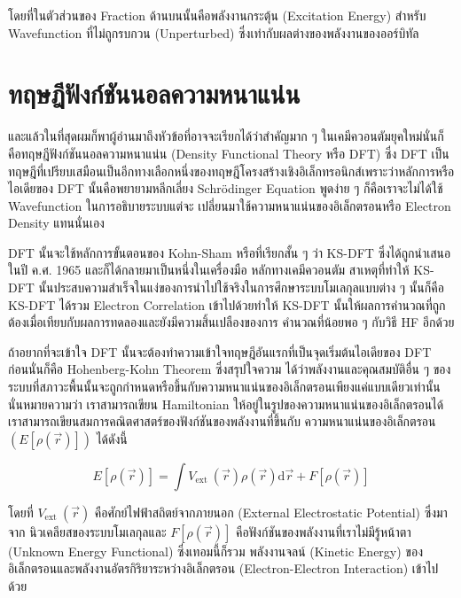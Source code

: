 \noindent โดยที่ในตัวส่วนของ Fraction ด้านบนนั้นคือพลังงานกระตุ้น (Excitation Energy) สำหรับ Wavefunction ที่ไม่ถูกรบกวน 
(Unperturbed) ซึ่งเท่ากับผลต่างของพลังงานของออร์บิทัล

\section{ทฤษฎีฟังก์ชันนอลความหนาแน่น}

และแล้วในที่สุดผมก็พาผู้อ่านมาถึงหัวข้อที่อาจจะเรียกได้ว่าสำคัญมาก ๆ ในเคมีควอนตัมยุคใหม่นั่นก็คือทฤษฎีฟังก์ชันนอลความหนาแน่น (Density 
Functional Theory หรือ DFT) ซึ่ง DFT เป็นทฤษฎีที่เปรียบเสมือนเป็นอีกทางเลือกหนึ่งของทฤษฎีโครงสร้างเชิงอิเล็กทรอนิกส์เพราะว่าหลักการหรือ%
ไอเดียของ DFT นั้นคือพยายามหลีกเลี่ยง Schr\"{o}dinger Equation พูดง่าย ๆ ก็คือเราจะไม่ได้ใช้ Wavefunction ในการอธิบายระบบแต่จะ%
เปลี่ยนมาใช้ความหนาแน่นของอิเล็กตรอนหรือ Electron Density แทนนั่นเอง 

DFT นั้นจะใช้หลักการขั้นตอนของ Kohn-Sham หรือที่เรียกสั้น ๆ ว่า KS-DFT ซึ่งได้ถูกนำเสนอในปี ค.ศ. 1965 และก็ได้กลายมาเป็นหนึ่งในเครื่องมือ%
หลักทางเคมีควอนตัม สาเหตุที่ทำให้ KS-DFT นั้นประสบความสำเร็จในแง่ของการนำไปใช้จริงในการศึกษาระบบโมเลกุลแบบต่าง ๆ นั้นก็คือ KS-DFT 
ได้รวม Electron Correlation เข้าไปด้วยทำให้ KS-DFT นั้นให้ผลการคำนวณที่ถูกต้องเมื่อเทียบกับผลการทดลองและยังมีความสิ้นเปลืองของการ%
คำนวณที่น้อยพอ ๆ กับวิธี HF อีกด้วย 

ถ้าอยากที่จะเข้าใจ DFT นั้นจะต้องทำความเข้าใจทฤษฎีอันแรกที่เป็นจุดเริ่มต้นไอเดียของ DFT ก่อนนั่นก็คือ Hohenberg-Kohn Theorem ซึ่งสรุปใจความ%
ได้ว่าพลังงานและคุณสมบัติอื่น ๆ ของระบบที่สภาวะพื้นนั้นจะถูกกำหนดหรือขึ้นกับความหนาแน่นของอิเล็กตรอนเพียงแค่แบบเดียวเท่านั้น นั่นหมายความว่า%
เราสามารถเขียน Hamiltonian ให้อยู่ในรูปของความหนาแน่นของอิเล็กตรอนได้ เราสามารถเขียนสมการคณิตศาสตร์ของฟังก์ชันของพลังงานที่ขึ้นกับ%
ความหนาแน่นของอิเล็กตรอน $(E[\rho(\vec{r})])$ ได้ดังนี้

\begin{equation}
    \label{eq:Energy_Functional_DFT}
    E[\rho(\vec{r})] 
    = 
    \int V_{\text{ext }}(\vec{r}) \rho(\vec{r}) \mathrm{d} \vec{r} 
        + F[\rho(\vec{r})]
\end{equation}

\noindent โดยที่ $V_{\text{ext }}(\vec{r})$ คือศักย์ไฟฟ้าสถิตย์จากภายนอก (External Electrostatic Potential) ซึ่งมาจาก%
นิวเคลียสของระบบโมเลกุลและ $F[\rho(\vec{r})]$ คือฟังก์ชันของพลังงานที่เราไม่มีรู้หน้าตา (Unknown Energy Functional) ซึ่งเทอมนี้ก็รวม%
พลังงานจลน์ (Kinetic Energy) ของอิเล็กตรอนและพลังงานอัตรกิริยาระหว่างอิเล็กตรอน (Electron-Electron Interaction) เข้าไปด้วย

